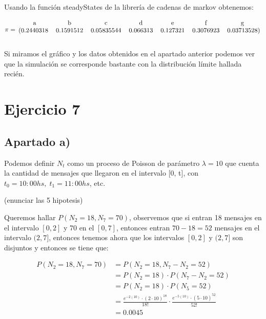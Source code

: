 \documentclass[11pt]{article}
\begin{document}
Usando la función steadyStates de la librería de cadenas de markov obtenemos:

\begin{equation*}
  \pi = 
  \begin{blockarray}{ccccccc}
    \text{a} & \text{b} & \text{c} & \text{d} & \text{e} & \text{f} & \text{g} \\
    \begin{block}{(ccccccc)}
      0.2440318 & 0.1591512 & 0.05835544 & 0.066313 & 0.127321 & 0.3076923 & 0.03713528 \\
    \end{block}
  \end{blockarray}
\end{equation*}

Si miramos el gráfico y los datos obtenidos en el apartado anterior podemos ver que la simulación 
se corresponde bastante con la distribución límite hallada recién.


\section{Ejercicio 7}

\subsection*{Apartado a)}

Podemos definir $N_t$ como un proceso de Poisson de parámetro $\lambda = 10$ que
cuenta la cantidad de mensajes que llegaron en el intervalo [0, t], con $t_0 = 10:00hs, \;
t_1 = 11:00hs$, etc. 

(enunciar las 5 hipotesis)

Queremos hallar $ P(N_2 = 18, N_7 = 70) $, observemos que si entran 18 mensajes en
el intervalo $[0, 2]$ y 70 en el $[0, 7]$, entonces entran $70 - 18 = 52$ mensajes en
el intervalo $(2, 7]$, entonces tenemos ahora que los intervalos $[0, 2] $ y $ (2, 7] $
son disjuntos y entonces se tiene que:

\begin{align*}
  P(N_2 = 18, N_7 = 70) &= P(N_2 = 18, N_7 - N_2 = 52) \\
                        &= P(N_2 = 18) \cdot P(N_7 - N_2 = 52) \\
                        &= P(N_2 = 18) \cdot P(N_5 = 52) \\
                        &= \frac{e^{-2(10)} \cdot (2 \cdot 10)^{18}}{18!} \cdot \frac{e^{-5(10)} \cdot (5 \cdot 10)^{52}}{52!} \\
                        &= 0.0045
\end{align*}
\end{document}
